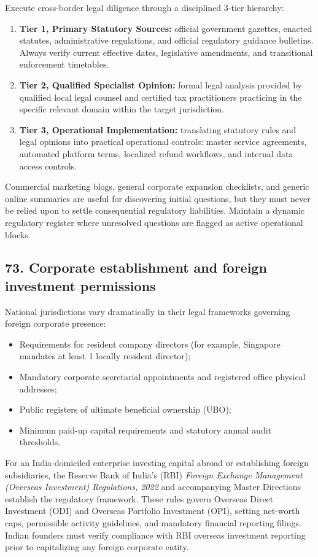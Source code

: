 Execute cross-border legal diligence through a disciplined 3-tier hierarchy:
\begin{enumerate}
    \item \textbf{Tier 1, Primary Statutory Sources:} official government gazettes, enacted statutes, administrative regulations, and official regulatory guidance bulletins. Always verify current effective dates, legislative amendments, and transitional enforcement timetables.
    \item \textbf{Tier 2, Qualified Specialist Opinion:} formal legal analysis provided by qualified local legal counsel and certified tax practitioners practicing in the specific relevant domain within the target jurisdiction.
    \item \textbf{Tier 3, Operational Implementation:} translating statutory rules and legal opinions into practical operational controls: master service agreements, automated platform terms, localized refund workflows, and internal data access controls.
\end{enumerate}
Commercial marketing blogs, general corporate expansion checklists, and generic online summaries are useful for discovering initial questions, but they must never be relied upon to settle consequential regulatory liabilities. Maintain a dynamic regulatory register where unresolved questions are flagged as active operational blocks.

\subsection{73. Corporate establishment and foreign investment permissions}

National jurisdictions vary dramatically in their legal frameworks governing foreign corporate presence:
\begin{itemize}
    \item Requirements for resident company directors (for example, Singapore mandates at least 1 locally resident director);
    \item Mandatory corporate secretarial appointments and registered office physical addresses;
    \item Public registers of ultimate beneficial ownership (UBO);
    \item Minimum paid-up capital requirements and statutory annual audit thresholds.
\end{itemize}

For an India-domiciled enterprise investing capital abroad or establishing foreign subsidiaries, the Reserve Bank of India's (RBI) \textit{Foreign Exchange Management (Overseas Investment) Regulations, 2022} and accompanying Master Directions establish the regulatory framework. These rules govern Overseas Direct Investment (ODI) and Overseas Portfolio Investment (OPI), setting net-worth caps, permissible activity guidelines, and mandatory financial reporting filings. Indian founders must verify compliance with RBI overseas investment reporting prior to capitalizing any foreign corporate entity.

